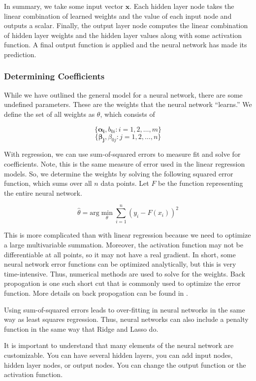 \documentclass[12pt]{article}
\begin{document}
In summary, we take some input vector $\textbf{x}$. Each hidden layer node takes the linear combination of learned weights and the value of each input node and outputs a scalar. Finally, the output layer node computes the linear combination of hidden layer weights and the hidden layer values along with some activation function. A final output function is applied and the neural network has made its prediction.

\subsubsection{Determining Coefficients}
While we have outlined the general model for a neural network, there are some undefined parameters. These are the weights that the neural network ``learns.'' We define the set of all weights as $\theta$, which consists of 

$$\{\boldsymbol{\alpha_i}, b_{0i}: i = 1, 2, \dots, m\}$$
$$\{\boldsymbol{\beta_j}, \beta_{0j}:  j= 1, 2, \dots, n\}$$

With regression, we can use sum-of-squared errors to measure fit and solve for coefficients. Note, this is the same measure of error used in the linear regression models. 
So, we determine the weights by solving the following squared error function, which sums over all $n$ data points. Let $F$ be the function representing the entire neural network.

$$\hat{\theta} = \text{arg} \min_\theta  \sum_{i=1}^{n} (y_{i} - F(x_i))^2$$ 

This is more complicated than with linear regression because we need to optimize a large multivariable summation. Moreover, the activation function may not be differentiable at all points, so it may not have a real gradient. In short, some neural network error functions can be optimized analytically, but this is very time-intensive. Thus, numerical methods are used to solve for the weights. Back propogation is one such short cut that is commonly used to optimize the error function. More details on back propogation can be found in \cite[354]{springer}. 

Using sum-of-squared errors leads to over-fitting in neural networks in the same way as least squares regression. Thus, neural networks can also include a penalty function in the same way that Ridge and Lasso do. 

It is important to understand that many elements of the neural network are customizable. You can have several hidden layers, you can add input nodes, hidden layer nodes, or output nodes. You can change the output function or the activation function. 
\end{document}
